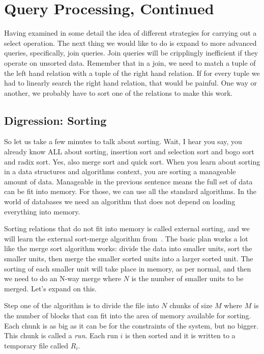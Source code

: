 




\section*{Query Processing, Continued}

Having examined in some detail the idea of different strategies for carrying out a select operation. The next thing we would like to do is expand to more advanced queries, specifically, join queries. Join queries will be cripplingly inefficient if they operate on unsorted data. Remember that in a join, we need to match a tuple of the left hand relation with a tuple of the right hand relation. If for every tuple we had to linearly search the right hand relation, that would be painful. One way or another, we probably have to sort one of the relations to make this work.

\subsection*{Digression: Sorting}

So let us take a few minutes to talk about sorting. Wait, I hear you say, you already know ALL about sorting, insertion sort and selection sort and bogo sort and radix sort. Yes, also merge sort and quick sort. When you learn about sorting in a data structures and algorithms context, you are sorting a manageable amount of data. Manageable in the previous sentence means the full set of data can be fit into memory. For those, we can use all the standard algorithms. In the world of databases we need an algorithm that does not depend on loading everything into memory.

Sorting relations that do not fit into memory is called external sorting, and we will learn the external sort-merge algorithm from~\cite{dsc}. The basic plan works a lot like the merge sort algorithm works: divide the data into smaller units, sort the smaller units, then merge the smaller sorted units into a larger sorted unit. The sorting of each smaller unit will take place in memory, as per normal, and then we need to do an N-way merge where $N$ is the number of smaller units to be merged. Let's expand on this.

Step one of the algorithm is to divide the file into $N$ chunks of size $M$ where $M$ is the number of blocks that can fit into the area of memory available for sorting. Each chunk is as big as it can be for the constraints of the system, but no bigger. This chunk is called a \textit{run}. Each run $i$ is then sorted and it is written to a temporary file called $R_{i}$.

